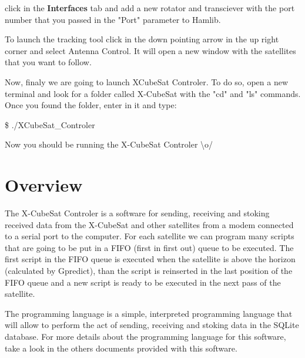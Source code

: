 \documentclass[pdftex,11pt,a4paper,titlepage]{report}
\begin{document}
click in the \textbf{Interfaces} tab and add a new rotator and transciever with the port number that you passed in the "Port" parameter to Hamlib. 

To launch the tracking tool click in the down pointing arrow in the up right corner and select Antenna Control. It will open a new window with the satellites that you want to follow. 

Now, finaly we are going to launch XCubeSat Controler. To do so, open a new terminal and look for a folder called X-CubeSat with the "cd" and "ls" commands. Once you found the folder, enter in it and type:
\begin{framed}
\$ ./XCubeSat\_Controler
\end{framed}

Now you should be running the X-CubeSat Controler \textbackslash o/

\chapter{Overview}
\hspace{0.4cm} The X-CubeSat Controler is a software for sending, receiving and stoking received data from the X-CubeSat and other satellites from a modem connected to a serial port to the computer. For each satellite we can program many scripts that are going to be put in a FIFO (first in first out) queue to be executed. The first script in the FIFO queue is executed when the satellite is above the horizon (calculated by Gpredict), than the script is reinserted in the last position of the FIFO queue and a new script is ready to be executed in the next pass of the satellite. 

The programming language is a simple, interpreted programming language that will allow to perform the act of sending, receiving and stoking data in the SQLite database. For more details about the programming language for this software, take a look in the others documents provided with this software. 
\end{document}

